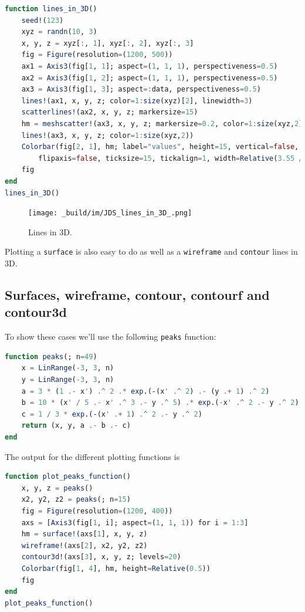 \documentclass[
  notoc %
]{tufte-book}
\newcommand{\passthrough}[1]{#1}
\begin{document}
\begin{lstlisting}[language=Julia]
function lines_in_3D()
    seed!(123)
    xyz = randn(10, 3)
    x, y, z = xyz[:, 1], xyz[:, 2], xyz[:, 3]
    fig = Figure(resolution=(1200, 500))
    ax1 = Axis3(fig[1, 1]; aspect=(1, 1, 1), perspectiveness=0.5)
    ax2 = Axis3(fig[1, 2]; aspect=(1, 1, 1), perspectiveness=0.5)
    ax3 = Axis3(fig[1, 3]; aspect=:data, perspectiveness=0.5)
    lines!(ax1, x, y, z; color=1:size(xyz)[2], linewidth=3)
    scatterlines!(ax2, x, y, z; markersize=15)
    hm = meshscatter!(ax3, x, y, z; markersize=0.2, color=1:size(xyz,2))
    lines!(ax3, x, y, z; color=1:size(xyz,2))
    Colorbar(fig[2, 1], hm; label="values", height=15, vertical=false,
        flipaxis=false, ticksize=15, tickalign=1, width=Relative(3.55 / 4))
    fig
end
lines_in_3D()
\end{lstlisting}

\begin{figure}
\hypertarget{fig:lines_in_3D}{%
\centering
\texttt{[image: \_build/im/JDS\_lines\_in\_3D\_.png]}
\caption{Lines in 3D.}\label{fig:lines_in_3D}
}
\end{figure}

Plotting a \passthrough{\lstinline!surface!} is also easy to do as well
as a \passthrough{\lstinline!wireframe!} and
\passthrough{\lstinline!contour!} lines in 3D.

\hypertarget{surfaces-wireframe-contour-contourf-and-contour3d}{%
\subsection{Surfaces, wireframe, contour, contourf and
contour3d}\label{surfaces-wireframe-contour-contourf-and-contour3d}}

To show these cases we'll use the following
\passthrough{\lstinline!peaks!} function:

\begin{lstlisting}[language=Julia]
function peaks(; n=49)
    x = LinRange(-3, 3, n)
    y = LinRange(-3, 3, n)
    a = 3 * (1 .- x') .^ 2 .* exp.(-(x' .^ 2) .- (y .+ 1) .^ 2)
    b = 10 * (x' / 5 .- x' .^ 3 .- y .^ 5) .* exp.(-x' .^ 2 .- y .^ 2)
    c = 1 / 3 * exp.(-(x' .+ 1) .^ 2 .- y .^ 2)
    return (x, y, a .- b .- c)
end
\end{lstlisting}

The output for the different plotting functions is

\begin{lstlisting}[language=Julia]
function plot_peaks_function()
    x, y, z = peaks()
    x2, y2, z2 = peaks(; n=15)
    fig = Figure(resolution=(1200, 400))
    axs = [Axis3(fig[1, i]; aspect=(1, 1, 1)) for i = 1:3]
    hm = surface!(axs[1], x, y, z)
    wireframe!(axs[2], x2, y2, z2)
    contour3d!(axs[3], x, y, z; levels=20)
    Colorbar(fig[1, 4], hm, height=Relative(0.5))
    fig
end
plot_peaks_function()
\end{lstlisting}
\end{document}
